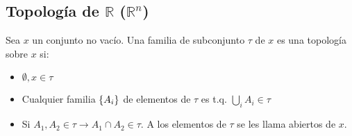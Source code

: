 \subsection{Topología de $\mathbb{R}$ ($\mathbb{R}^n$)}
\begin{definition}
Sea $x$ un conjunto no vacío. Una familia de subconjunto $\tau$ de $x$ es una topología sobre $x$ si: 
\begin{itemize}
    \item $\emptyset, x\in \tau$
    \item Cualquier familia $\{A_i\}$ de elementos de $\tau$ es t.q. $\bigcup_i A_i\in \tau$
    \item Si $A_1,A_2\in \tau\to A_1\cap A_2\in \tau$. A los elementos de $\tau$ se les llama abiertos de $x$. 
\end{itemize}
\end{definition}